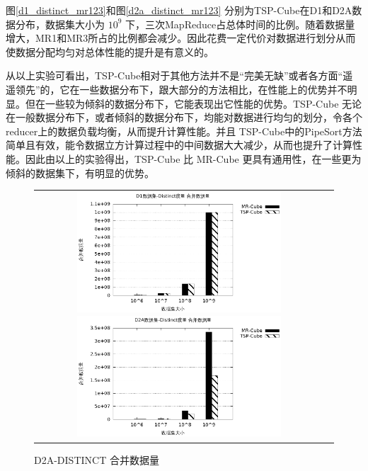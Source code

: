 图\ref{d1_distinct_mr123}和图\ref{d2a_distinct_mr123} 分别为TSP-Cube在D1和D2A数据分布，数据集大小为 ${10}^{9}$ 下，三次MapReduce占总体时间的比例。随着数据量增大，MR1和MR3所占的比例都会减少。因此花费一定代价对数据进行划分从而使数据分配均匀对总体性能的提升是有意义的。

从以上实验可看出，TSP-Cube相对于其他方法并不是``完美无缺”或者各方面``遥遥领先”的，它在一些数据分布下，跟大部分的方法相比，在性能上的优势并不明显。但在一些较为倾斜的数据分布下，它能表现出它性能的优势。TSP-Cube 无论在一般数据分布下，或者倾斜的数据分布下，均能对数据进行均匀的划分，令各个reducer上的数据负载均衡，从而提升计算性能。并且 TSP-Cube中的PipeSort方法简单且有效，能令数据立方计算过程中的中间数据大大减少，从而也提升了计算性能。因此由以上的实验得出，TSP-Cube 比 MR-Cube 更具有通用性，在一些更为倾斜的数据集下，有明显的优势。





\begin{figure}[!ht]
\begin{tabular}{cc}

\begin{minipage}[t]{0.5\textwidth}
\centering\includegraphics[width=3in]{picture/ch_experiment_gnuplot_eps/d1_distinct_interdata} 
\caption{D1-DISTINCT 合并数据量}\label{d1_distinct_interdata} 
\end{minipage}

\begin{minipage}[t]{0.5\textwidth}
\centering\includegraphics[width=3in]{picture/ch_experiment_gnuplot_eps/d2a_distinct_interdata} 
\caption{D2A-DISTINCT 合并数据量}\label{d2a_distinct_interdata} 
\end{minipage}

\end{tabular}
\end{figure}



